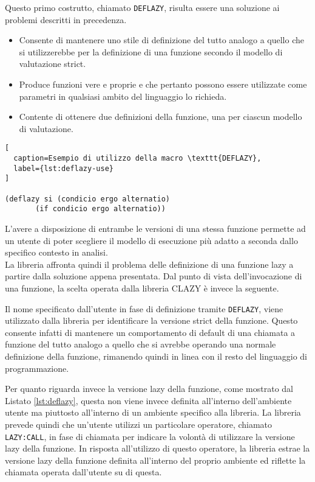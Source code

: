 Questo primo costrutto, chiamato \texttt{DEFLAZY}, risulta essere una soluzione
ai problemi descritti in precedenza.

\begin{itemize}

\item Consente di mantenere uno stile di definizione del tutto analogo a quello
che si utilizzerebbe per la definizione di una funzione secondo il modello di
valutazione strict.

\item Produce funzioni vere e proprie e che pertanto possono essere utilizzate
come parametri in qualsiasi ambito del linguaggio lo richieda.

\item Contente di ottenere due definizioni della funzione, una per ciascun
modello di valutazione.

\end{itemize}

\begin{lstlisting}[
  caption=Esempio di utilizzo della macro \texttt{DEFLAZY},
  label={lst:deflazy-use}
]

(deflazy si (condicio ergo alternatio)
       (if condicio ergo alternatio))

\end{lstlisting}

L'avere a disposizione di entrambe le versioni di una stessa funzione permette
ad un utente di poter scegliere il modello di esecuzione più adatto a seconda
dallo specifico contesto in analisi.\\

La libreria affronta quindi il problema delle definizione di una funzione lazy a
partire dalla soluzione appena presentata. Dal punto di vista dell'invocazione
di una funzione, la scelta operata dalla libreria CLAZY è invece la seguente.

Il nome specificato dall'utente in fase di definizione tramite \texttt{DEFLAZY},
viene utilizzato dalla libreria per identificare la versione strict della
funzione. Questo consente infatti di mantenere un comportamento di default di
una chiamata a funzione del tutto analogo a quello che si avrebbe operando una
normale definizione della funzione, rimanendo quindi in linea con il resto del
linguaggio di programmazione.

Per quanto riguarda invece la versione lazy della funzione, come mostrato dal
Listato \ref{lst:deflazy}, questa non viene invece definita all'interno
dell'ambiente utente ma piuttosto all'interno di un ambiente specifico alla
libreria. La libreria prevede quindi che un'utente utilizzi un particolare
operatore, chiamato \texttt{LAZY:CALL}, in fase di chiamata per indicare la
volontà di utilizzare la versione lazy della funzione. In risposta all'utilizzo
di questo operatore, la libreria estrae la versione lazy della funzione definita
all'interno del proprio ambiente ed riflette la chiamata operata dall'utente su
di questa.

